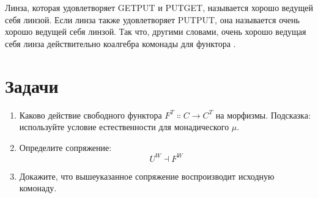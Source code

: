 Линза, которая удовлетворяет GETPUT и PUTGET, называется хорошо ведущей себя линзой.
Если линза также удовлетворяет PUTPUT, она называется очень хорошо ведущей себя линзой.
Так что, другими словами, очень хорошо ведущая себя линза действительно коалгебра комонады для
функтора .

\section{Задачи}

\begin{enumerate}
  \tightlist
  \item
        Каково действие свободного функтора
        $F^T \Colon C \to C^T$ на морфизмы. Подсказка: используйте
        условие естественности для монадического $\mu$.
  \item
        Определите сопряжение:
        \[U^W \dashv F^W\]
  \item
        Докажите, что вышеуказанное сопряжение воспроизводит исходную комонаду.
\end{enumerate}
